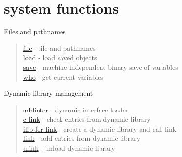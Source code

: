 \chapter*{system functions}

Files and pathnames
\begin{quote}
\noindent
\hyperlink{file}{file} - file and pathnames\\
\hyperlink{load}{load} - load saved objects\\
\hyperlink{save}{save} - machine independent binary save of variables\\
\hyperlink{who}{who} - get current variables\\
\end{quote}

Dynamic library management
\begin{quote}
\noindent 
\hyperlink{addinter}{addinter} - dynamic interface loader\\
\hyperlink{c_link}{c-link} - check entries from dynamic library \\
\hyperlink{ilib_for_link}{ilib-for-link} - create a dynamic library and call link \\
\hyperlink{link}{link} - add entries from dynamic library \\
\hyperlink{ulink}{ulink} - unload dynamic library \\
\end{quote}



  
  
 
 
 
